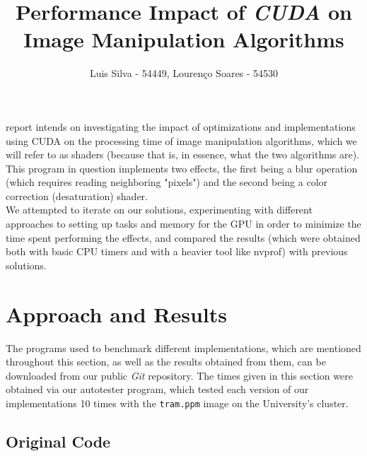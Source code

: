 \documentclass[10pt,journal,compsoc]{IEEEtran}
\def\code#1{\texttt{#1}}
\begin{document}
\title{Performance Impact of \textit{CUDA} on Image Manipulation Algorithms}

\author{Luis Silva - 54449,
        Lourenço Soares - 54530%
}


\maketitle


 report intends on investigating the impact of optimizations and implementations using CUDA on the processing time of image manipulation algorithms, which we will refer to as shaders (because that is, in essence, what the two algorithms are). This program in question implements two effects, the first being a blur operation (which requires reading neighboring "pixels") and the second being a color correction (desaturation) shader. \\

\noindent We attempted to iterate on our solutions, experimenting with different approaches to setting up tasks and memory for the GPU in order to minimize the time spent performing the effects, and compared the results (which were obtained both with basic CPU timers and with a heavier tool like nvprof) with previous solutions. 


\section{Approach and Results}

\noindent The programs used to benchmark different implementations, which are mentioned throughout this section, as well as the results obtained from them, can be downloaded from our public \textit{Git} repository\cite{projectrepo}. The times given in this section were obtained via our autotester program, which tested each version of our implementations 10 times with the \code{tram.ppm} image on the University's cluster.


\subsection{Original Code}
\end{document}
